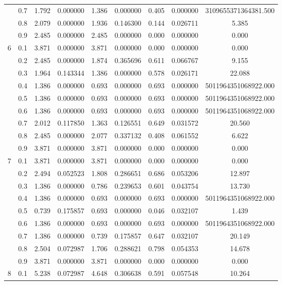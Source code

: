 \begin{longtable}{ | c | c || c | c | c | c | c | c | c | }
 & 0.7 & 1.792 & 0.000000 & 1.386 & 0.000000 & 0.405 & 0.000000 & 3109655371364381.500 \\
 & 0.8 & 2.079 & 0.000000 & 1.936 & 0.146300 & 0.144 & 0.026711 & 5.385 \\
 & 0.9 & 2.485 & 0.000000 & 2.485 & 0.000000 & 0.000 & 0.000000 & 0.000 \\
 \hline
\multirow{9}{*}{6} & 0.1 & 3.871 & 0.000000 & 3.871 & 0.000000 & 0.000 & 0.000000 & 0.000 \\
 & 0.2 & 2.485 & 0.000000 & 1.874 & 0.365696 & 0.611 & 0.066767 & 9.155 \\
 & 0.3 & 1.964 & 0.143344 & 1.386 & 0.000000 & 0.578 & 0.026171 & 22.088 \\
 & 0.4 & 1.386 & 0.000000 & 0.693 & 0.000000 & 0.693 & 0.000000 & 5011964351068922.000 \\
 & 0.5 & 1.386 & 0.000000 & 0.693 & 0.000000 & 0.693 & 0.000000 & 5011964351068922.000 \\
 & 0.6 & 1.386 & 0.000000 & 0.693 & 0.000000 & 0.693 & 0.000000 & 5011964351068922.000 \\
 & 0.7 & 2.012 & 0.117850 & 1.363 & 0.126551 & 0.649 & 0.031572 & 20.560 \\
 & 0.8 & 2.485 & 0.000000 & 2.077 & 0.337132 & 0.408 & 0.061552 & 6.622 \\
 & 0.9 & 3.871 & 0.000000 & 3.871 & 0.000000 & 0.000 & 0.000000 & 0.000 \\
 \hline
\multirow{9}{*}{7} & 0.1 & 3.871 & 0.000000 & 3.871 & 0.000000 & 0.000 & 0.000000 & 0.000 \\
 & 0.2 & 2.494 & 0.052523 & 1.808 & 0.286651 & 0.686 & 0.053206 & 12.897 \\
 & 0.3 & 1.386 & 0.000000 & 0.786 & 0.239653 & 0.601 & 0.043754 & 13.730 \\
 & 0.4 & 1.386 & 0.000000 & 0.693 & 0.000000 & 0.693 & 0.000000 & 5011964351068922.000 \\
 & 0.5 & 0.739 & 0.175857 & 0.693 & 0.000000 & 0.046 & 0.032107 & 1.439 \\
 & 0.6 & 1.386 & 0.000000 & 0.693 & 0.000000 & 0.693 & 0.000000 & 5011964351068922.000 \\
 & 0.7 & 1.386 & 0.000000 & 0.739 & 0.175857 & 0.647 & 0.032107 & 20.149 \\
 & 0.8 & 2.504 & 0.072987 & 1.706 & 0.288621 & 0.798 & 0.054353 & 14.678 \\
 & 0.9 & 3.871 & 0.000000 & 3.871 & 0.000000 & 0.000 & 0.000000 & 0.000 \\
 \hline
\multirow{9}{*}{8} & 0.1 & 5.238 & 0.072987 & 4.648 & 0.306638 & 0.591 & 0.057548 & 10.264 \\

\end{longtable}
